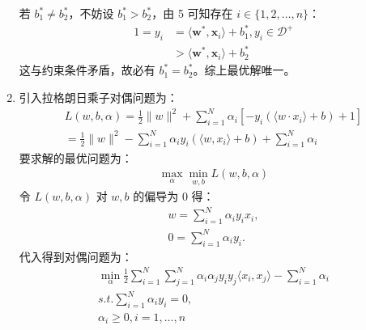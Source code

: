 \documentclass[11pt,letter,notitlepage]{article}
\begin{document}
\begin{solution}
\begin{enumerate}
		若 $b_1^* \neq b_2^*$，不妨设 $b_1^* > b_2^*$，由 5 可知存在 $i \in \{1, 2,\dots, n\}$：
		\begin{align*}
			1=y_i &= \langle \textbf{w}^*, \textbf{x}_i \rangle + b_1^*, y_i \in \mathcal{D}^+\\
			&> \langle \textbf{w}^*, \textbf{x}_i \rangle + b_2^*
		\end{align*}
		这与约束条件矛盾，故必有 $b_1^* = b_2^*$。综上最优解唯一。
		\item 引入拉格朗日乘子对偶问题为：
		\begin{align*}
			{ L ( w , b , \alpha ) = \frac { 1 } { 2 } \| w \| ^ { 2 } + \sum _ { i = 1 } ^ { N } \alpha _ { i } \left[ - y _ { i } \left( \langle w \cdot x _ { i } \rangle + b \right) + 1 \right] } \\ { = \frac { 1 } { 2 } \| w \| ^ { 2 } - \sum _ { i = 1 } ^ { N } \alpha _ { i } y _ { i } \left(\langle w, x_i\rangle + b \right) + \sum _ { i = 1 } ^ { N } \alpha _ { i } }
		\end{align*}
		要求解的最优问题为：
		\begin{align*}
			\max_{\alpha} \min_{w, b} L ( w , b , \alpha )
		\end{align*}
		令 $L(w, b, \alpha)$ 对 $w, b$ 的偏导为 0 得：
		\begin{align*}
			w = \sum\limits_{i=1}^{N}\alpha_iy_ix_i,\\
			0 = \sum\limits_{i=1}^{N}\alpha_iy_i.
		\end{align*} 
		代入得到对偶问题为：
		\begin{align*}
			\min_{\alpha} \frac{1}{2}\sum\limits_{i=1}^{N}\sum\limits_{j=1}^{N}\alpha_i\alpha_jy_iy_j\langle x_i, x_j \rangle - \sum\limits_{i=1}^{N} \alpha_i \\
			s.t. \sum\limits_{i=1}^{N}\alpha_iy_i = 0,\\
			\alpha_i \geqslant 0, i= 1,\ldots,n
		\end{align*}
	\end{enumerate}
\end{solution}
\end{document}
